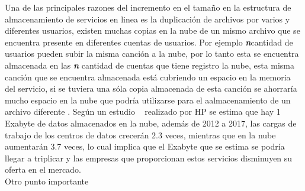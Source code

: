 Una de las principales razones del incremento en el tamaño en la estructura de almacenamiento de servicios en linea es la duplicación de archivos por varios y diferentes usuarios, existen muchas copias en la nube de un mismo archivo que se encuentra presente en diferentes cuentas de usuarios. Por ejemplo \textbf{\textit{n}}cantidad de  usuarios pueden subir la misma canción a la nube, por lo tanto esta se encuentra almacenada en las \textbf{\textit{n}} cantidad de cuentas que tiene registro la nube, esta misma canción que se encuentra almacenada está cubriendo un espacio en la memoria del servicio, si se tuviera una sóla copia almacenada de esta canción se ahorraría mucho espacio en la nube que podría utilizarse para el aalmacenamiento de un archivo diferente . Según un estudio ~\cite{popa} realizado por HP se estima que hay 1 Exabyte de datos almacenados en la nube, además de 2012 a 2017, las cargas de trabajo de los centros de datos crecerán 2.3 veces, mientras que en la nube aumentarán 3.7 veces, lo cual implica que el Exabyte que se estima se podría llegar a triplicar y las empresas que proporcionan estos servicios disminuyen su oferta en el mercado. 
\\ 
Otro punto importante 
\\

